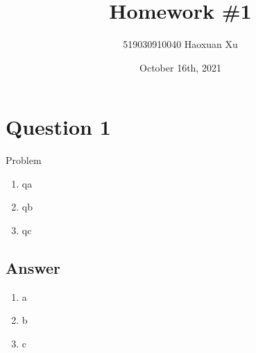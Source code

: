 \documentclass[
	12pt, %
]{fphw}
\title{Homework \#1} %
\author{519030910040 Haoxuan Xu} %
\date{October 16th, 2021} %
\institute{Shanghai Jiao Tong University} %
\begin{document}
\maketitle %


\section*{Question 1}

\begin{problem}
	Problem

	\medskip
	
	\begin{enumerate}
		\item qa
		\item qb
		\item qc
	\end{enumerate}
\end{problem}



\subsection*{Answer}

\begin{enumerate} %
	\item a
	\item b
	\item c
\end{enumerate}
\end{document}
